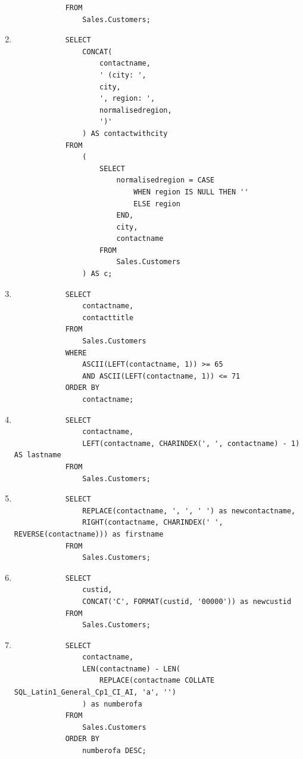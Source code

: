 \documentclass[12pt,titlepage]{article}
\begin{document}
\begin{enumerate}
{\begin{verbatim}
            FROM
                Sales.Customers;
        \end{verbatim}
    }
    \pagebreak
    \item {
        \begin{verbatim}
            SELECT
                CONCAT(
                    contactname,
                    ' (city: ',
                    city, 
                    ', region: ',
                    normalisedregion,
                    ')'
                ) AS contactwithcity
            FROM
                (
                    SELECT
                        normalisedregion = CASE
                            WHEN region IS NULL THEN ''
                            ELSE region
                        END,
                        city,
                        contactname
                    FROM
                        Sales.Customers
                ) AS c;
        \end{verbatim}
    }
    \item {
        \begin{verbatim}
            SELECT
                contactname,
                contacttitle
            FROM
                Sales.Customers
            WHERE
                ASCII(LEFT(contactname, 1)) >= 65
                AND ASCII(LEFT(contactname, 1)) <= 71
            ORDER BY
                contactname;
        \end{verbatim}
    }
    \item {
        \begin{verbatim}
            SELECT
                contactname,
                LEFT(contactname, CHARINDEX(', ', contactname) - 1) AS lastname
            FROM
                Sales.Customers;
        \end{verbatim}
    }
    \item {
        \begin{verbatim}
            SELECT
                REPLACE(contactname, ', ', ' ') as newcontactname,
                RIGHT(contactname, CHARINDEX(' ', REVERSE(contactname))) as firstname
            FROM
                Sales.Customers;
        \end{verbatim}
    }
    \item {
        \begin{verbatim}
            SELECT
                custid,
                CONCAT('C', FORMAT(custid, '00000')) as newcustid
            FROM
                Sales.Customers;
        \end{verbatim}
    }
    \item {
        \begin{verbatim}
            SELECT
                contactname,
                LEN(contactname) - LEN(
                    REPLACE(contactname COLLATE SQL_Latin1_General_Cp1_CI_AI, 'a', '')
                ) as numberofa
            FROM
                Sales.Customers
            ORDER BY
                numberofa DESC;
        \end{verbatim}
    }
\end{enumerate}
\end{document}
